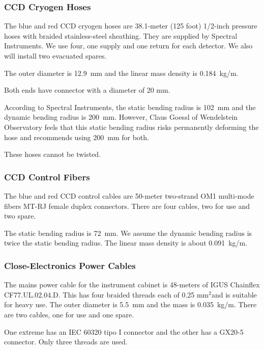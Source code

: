 \documentclass{article}
\newcommand{\sqmm}{\mbox{mm$^2$}}
\begin{document}
\subsubsection{CCD Cryogen Hoses}

The blue and red CCD cryogen hoses are 38.1-meter (125 foot) 1/2-inch pressure hoses with braided stainless-steel sheathing. They are supplied by Spectral Instruments. We use four, one supply and one return for each detector. We also will install two evacuated spares.


The outer diameter is 12.9~mm and the linear mass density is 0.184~kg/m.

Both ends have connector with a diameter of 20 mm.

According to Spectral Instruments, the static bending radius is 102~mm and the dynamic bending radius is 200~mm. However, Claus Goessl of Wendelstein Observatory feels that this static bending radius risks permanently deforming the hose and recommends using 200~mm for both.

These hoses cannot be twisted.

\subsubsection{CCD Control Fibers}

The blue and red CCD control cables are 50-meter two-strand OM1 multi-mode fibers MT-RJ female duplex connectors.  There are four cables, two for use and two spare. 

The static bending radius is 72~mm. We assume the dynamic bending radius is twice the static bending radius. The linear mass density is about 0.091~kg/m.

\subsubsection{Close-Electronics Power Cables}

The mains power cable for the instrument cabinet is 48-meters of IGUS Chainflex CF77.UL.02.04.D. This has four braided threads each of 0.25 \sqmm and is suitable for heavy use. The outer diameter is 5.5~mm and the mass is 0.035~kg/m. There are two cables, one for use and one spare.

One extreme has an IEC 60320 tipo I connector and the other has a GX20-5 connector. Only three threads are used.
\end{document}
